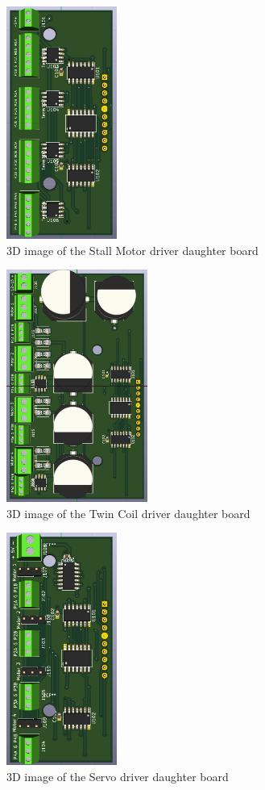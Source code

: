 \documentclass[12pt,twoside]{article}
\begin{document}
\begin{figure}[hbpt]\begin{centering}%
\includegraphics[height=3in]{SM-DaughterBoard.png}
\caption{3D image of the Stall Motor driver daughter board}
\end{centering}\end{figure}
\begin{figure}[hbpt]\begin{centering}%
\includegraphics[height=3in]{TC-DaughterBoard.png}
\caption{3D image of the Twin Coil driver daughter board}
\end{centering}\end{figure}
\begin{figure}[hbpt]\begin{centering}%
\includegraphics[height=3in]{TS-DaughterBoard.png}
\caption{3D image of the Servo driver daughter board}
\end{centering}\end{figure}
\clearpage
\end{document}
